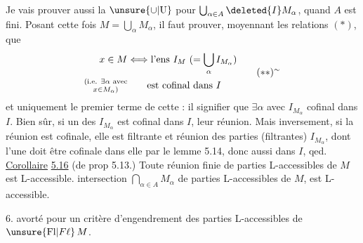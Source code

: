 Je vais prouver aussi la  $\unsure{\cup|\mathrm U}$  pour $\bigcup_{\alpha\in A}\deleted{I}M_\alpha$, quand $A$ est fini. Posant cette fois $M=\bigcup_\alpha M_\alpha$, il faut prouver, moyennant les relations $(\ast)$, que
\[
 \begin{aligned}
 x\in M &\Longleftrightarrow
  \text{l'ens }I_M\ (= \bigcup_\alpha I_{M_\alpha})\\
 \substack{\text{(i.e. }\exists\alpha\text{ avec}\\ x\in M_\alpha\text{)}} &\hspace{2em}\text{est cofinal dans }I
 \end{aligned}
 \tag*{$(\ast\ast)^{\sim}$}
\]
et uniquement  le premier terme de cette  : il  signifier que \deleted{$\unsure{\forall}$} $\exists\alpha$ avec $I_{M_\alpha}$ cofinal dans $I$. Bien sûr, si un des $I_{M_\alpha}$ est cofinal dans $I$,   leur réunion. Mais inversement, si la réunion est cofinale, elle est filtrante et réunion des parties (filtrantes) $I_{M_\alpha}$, dont l'une doit  être cofinale dans elle par le lemme 5.14, donc aussi dans $I$, qed.
\uline{Corollaire} \uline{5.16} (de prop 5.13.) Toute réunion finie de parties L-accessibles de $M$ est L-accessible.  intersection $\bigcap_{\alpha\in A}M_\alpha$ de  parties L-accessibles de $M$, est L-accessible.

6.  avorté pour un critère d'engendrement des parties L-accessibles de $\unsure{\mathrm{Fl}|F\ell}\,M$.

